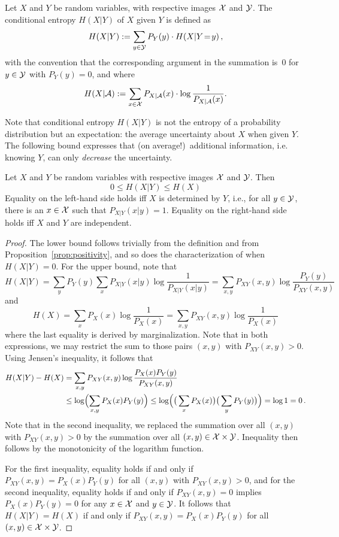 \begin{definition}\label{def:CondEntropy}
Let $X$ and $Y$ be random variables, with respective images ${\cal
X}$ and ${\cal Y}$. 
The conditional entropy $H(X|Y)$ of $X$
given $Y$ is defined as
\[
H(X|Y) := \sum_{y\in {\cal Y}} P_Y(y)\cdot H(X|Y\!=\!y) \, ,
\]
with the convention that the corresponding argument in the summation is~$0$ for $y \in  \cal Y$ with $P_Y(y)=0$, and where
\[
H(X|{\cal A}) := \sum_{x\in {\cal X}} P_{X|{\cal A}}(x)\cdot \log
\frac{1}{P_{X|{\cal A}}(x)}.
\]
\end{definition}
%
Note that conditional entropy $H(X|Y)$ is not the entropy of a probability
distribution but an expectation: the average uncertainty about $X$
when given $Y$. The following bound expresses that (on average!)\ additional information, i.e. knowing $Y$, can only {\em decrease} the uncertainty.

\begin{proposition}\label{prop:conditional-bounds}
Let $X$ and $Y$ be random variables with respective images ${\cal X}$ and $\cal Y$. Then
\[
0 \leq H(X|Y) \leq H(X)
\]
Equality on the left-hand side holds iff $X$ is determined by $Y$,
i.e., for all $y\in {\cal Y}$, there is an $x\in {\cal X}$ such that
$P_{X|Y}(x|y)=1$.
Equality on the right-hand side holds iff
$X$ and $Y$ are independent.
\end{proposition}
%
\begin{proof}
The lower bound follows trivially from the definition and from Proposition~\ref{prop:positivity}, and so does the characterization of when $H(X|Y) = 0$. For the upper bound, note that
\[
H(X|Y) = \sum_{y} P_Y(y) \sum_x P_{X|Y}(x|y) \log\frac{1}{P_{X|Y}(x|y)} = \sum_{x,y} P_{XY}(x,y) \log\frac{P_Y(y)}{P_{XY}(x,y)}
\]
and
\[
H(X) = \sum_x P_{X}(x) \log\frac{1}{P_{X}(x)} = \sum_{x,y} P_{XY}(x,y) \log\frac{1}{P_{X}(x)}
\]
where the last equality is derived by marginalization. Note that in both expressions, we may restrict the sum to those pairs $(x,y)$ with $P_{XY}(x,y) > 0$. 
Using Jensen's inequality, it follows that
\begin{align*}
H(X|Y) - H(X) &= \sum_{x,y} P_{XY}(x,y)\log
\frac{P_X(x)P_Y(y)}{P_{XY}(x,y)} \\
&\leq \log\Bigl( \sum_{x,y} P_X(x)P_Y(y) \Bigr) \leq \log\Bigl(\big(\sum_{x}P_X(x)\big)\big(\sum_{y}P_Y(y)\big)\Bigr) = \log 1 = 0 \, .
\end{align*}
Note that in the second inequality, we replaced the summation over all $(x,y)$ with $P_{XY}(x,y) > 0$ by the summation over all $(x,y) \in {\cal X} \times {\cal Y}$. Inequality then follows by the monotonicity of the logarithm function.

For the first inequality, equality holds if and only if $P_{XY}(x,y) = P_X(x) P_Y(y)$ for all $(x,y)$ with $P_{XY}(x,y) > 0$, and for the second inequality, equality holds if and only if $P_{XY}(x,y) = 0$ implies $P_X(x) P_Y(y) = 0$ for any $x \in \cal X$ and $y \in \cal Y$. It follows that $H(X|Y) = H(X)$ if and only if $P_{XY}(x,y) = P_X(x) P_Y(y)$ for all $(x,y) \in {\cal X} \times {\cal Y}$. 
\end{proof}


